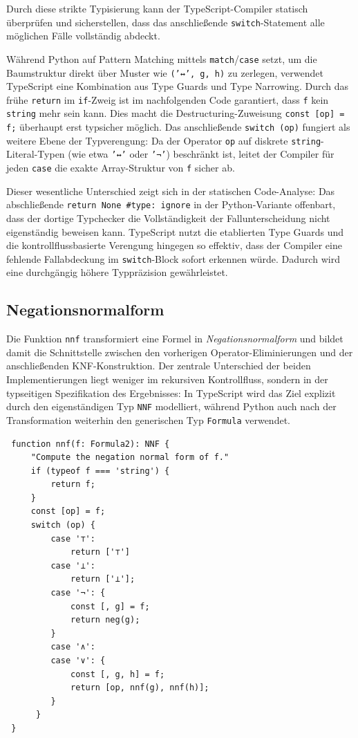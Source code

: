 Durch diese strikte Typisierung kann der TypeScript-Compiler statisch überprüfen und sicherstellen, dass das anschließende \texttt{switch}-Statement alle möglichen Fälle vollständig abdeckt.

Während Python auf Pattern Matching mittels \texttt{match}/\texttt{case} setzt, um die Baumstruktur direkt über Muster wie \texttt{('↔', g, h)} zu zerlegen, verwendet TypeScript eine Kombination aus Type Guards und Type Narrowing. Durch das frühe \texttt{return} im \texttt{if}-Zweig ist im nachfolgenden Code garantiert, dass \texttt{f} kein \texttt{string} mehr sein kann. Dies macht die Destructuring-Zuweisung \texttt{const [op] = f;} überhaupt erst typsicher möglich. Das anschließende \texttt{switch (op)} fungiert als weitere Ebene der Typverengung: Da der Operator \texttt{op} auf diskrete \texttt{string}-Literal-Typen (wie etwa \texttt{'↔'} oder \texttt{'¬'}) beschränkt ist, leitet der Compiler für jeden \texttt{case} die exakte Array-Struktur von \texttt{f} sicher ab.

Dieser wesentliche Unterschied zeigt sich in der statischen Code-Analyse: Das abschließende \texttt{return None \#type: ignore} in der Python-Variante offenbart, dass der dortige Typchecker die Vollständigkeit der Fallunterscheidung nicht eigenständig beweisen kann. TypeScript nutzt die etablierten Type Guards und die kontrollflussbasierte Verengung hingegen so effektiv, dass der Compiler eine fehlende Fallabdeckung im \texttt{switch}-Block sofort erkennen würde. Dadurch wird eine durchgängig höhere Typpräzision gewährleistet.

\subsection{Negationsnormalform}
Die Funktion \texttt{nnf} transformiert eine Formel in \textit{Negationsnormalform} und bildet damit die Schnittstelle zwischen den vorherigen Operator-Eliminierungen und der anschließenden \ac{KNF}-Konstruktion. 
Der zentrale Unterschied der beiden Implementierungen liegt weniger im rekursiven Kontrollfluss, sondern in der typseitigen Spezifikation des Ergebnisses: In TypeScript wird das Ziel explizit durch den eigenständigen Typ \texttt{NNF} modelliert, während Python auch nach der Transformation weiterhin den generischen Typ \texttt{Formula} verwendet. %

\begin{verbatim}
 function nnf(f: Formula2): NNF {
     "Compute the negation normal form of f."
     if (typeof f === 'string') {
         return f;
     }
     const [op] = f;
     switch (op) {
         case '⊤':
             return ['⊤']
         case '⊥':
             return ['⊥'];
         case '¬': {
             const [, g] = f;
             return neg(g);
         }
         case '∧':
         case '∨': {
             const [, g, h] = f;
             return [op, nnf(g), nnf(h)];
         }
      }
 }
\end{verbatim}

